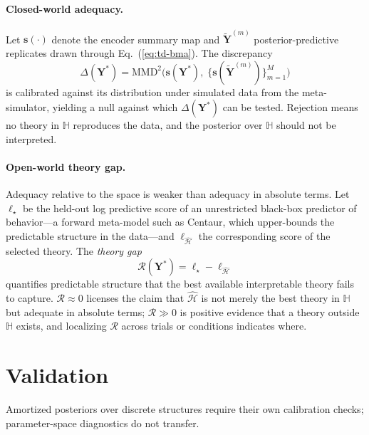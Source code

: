 \documentclass[11pt]{article}
\newcommand{\rmY}{\mathbf{Y}}
\newcommand{\rvs}{\bm{s}}
\providecommand{\cref}[1]{Eq.~(\ref{#1})}
\begin{document}
\paragraph{Closed-world adequacy.} Let $\rvs(\cdot)$ denote the encoder summary map and
$\tilde{\rmY}^{(m)}$ posterior-predictive replicates drawn through \cref{eq:td-bma}. The
discrepancy
%
\begin{equation}
\label{eq:td-mmd}
\Delta(\rmY^\ast) = \mathrm{MMD}^2\Big(\rvs(\rmY^\ast),\; \big\{\rvs(\tilde{\rmY}^{(m)})\big\}_{m=1}^M\Big)
\end{equation}
%
is calibrated against its distribution under simulated data from the meta-simulator,
yielding a null against which $\Delta(\rmY^\ast)$ can be tested. Rejection means no
theory in $\mathbb{H}$ reproduces the data, and the posterior over $\mathbb{H}$ should
not be interpreted.

\paragraph{Open-world theory gap.} Adequacy relative to the space is weaker than
adequacy in absolute terms. Let $\ell_\star$ be the held-out log predictive score of an
unrestricted black-box predictor of behavior---a forward meta-model such as Centaur,
which upper-bounds the predictable structure in the data---and $\ell_{\hat{\mathcal{H}}}$
the corresponding score of the selected theory. The \emph{theory gap}
%
\begin{equation}
\label{eq:td-gap}
\mathcal{R}(\rmY^\ast) = \ell_\star - \ell_{\hat{\mathcal{H}}}
\end{equation}
%
quantifies predictable structure that the best available interpretable theory fails to
capture. $\mathcal{R} \approx 0$ licenses the claim that $\hat{\mathcal{H}}$ is not
merely the best theory in $\mathbb{H}$ but adequate in absolute terms;
$\mathcal{R} \gg 0$ is positive evidence that a theory outside $\mathbb{H}$ exists, and
localizing $\mathcal{R}$ across trials or conditions indicates where.

\section{Validation}

Amortized posteriors over discrete structures require their own calibration checks;
parameter-space diagnostics do not transfer.
\end{document}
